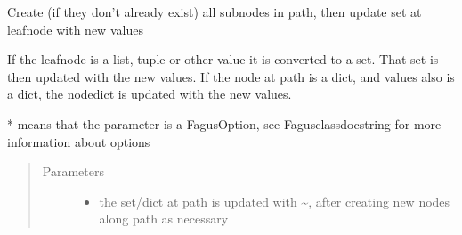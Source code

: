 \documentclass[a4paper,10pt,english]{sphinxmanual}
\begin{document}
\begin{fulllineitems}
\begin{fulllineitems}
\label{\detokenize{fagus.fagus:fagus.fagus.Fagus.update}}
\pysigstartsignatures
{}
\pysigstopsignatures
\sphinxAtStartPar
Create (if they don’t already exist) all sub\sphinxhyphen{}nodes in path, then update set at leaf\sphinxhyphen{}node with new values

\sphinxAtStartPar
If the leaf\sphinxhyphen{}node is a list, tuple or other value it is converted to a set. That set is then updated with the new
values. If the node at path is a dict, and values also is a dict, the node\sphinxhyphen{}dict is updated with the new values.

\sphinxAtStartPar
* means that the parameter is a FagusOption, see Fagus\sphinxhyphen{}class\sphinxhyphen{}docstring for more information about options
\begin{quote}\begin{description}
\item[{Parameters}] \leavevmode\begin{itemize}
\item {}
\sphinxAtStartPar
{} \textendash{} the set/dict at path is updated with \textasciitilde{}, after creating new nodes along path as necessary


\end{itemize}
\end{description}
\end{quote}
\end{fulllineitems}
\end{fulllineitems}
\end{document}

